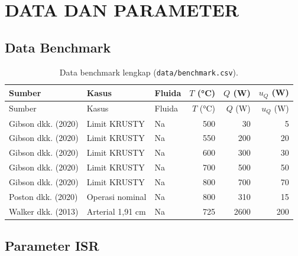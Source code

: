 \documentclass[
  indonesian,
  12pt,
  a4paper,
]{report}
\begin{document}
\chapter{DATA DAN PARAMETER}\label{data-dan-parameter}

\section{Data Benchmark}\label{data-benchmark}

\begin{longtable}[]{@{}lllrrr@{}}
\caption{Data benchmark lengkap
(\protect\texttt{data/benchmark.csv}).}\label{tbl-benchB}\tabularnewline
\toprule\noalign{}
Sumber & Kasus & Fluida & \(T\) (°C) & \(Q\) (W) & \(u_Q\) (W) \\
\midrule\noalign{}
\endfirsthead
\toprule\noalign{}
Sumber & Kasus & Fluida & \(T\) (°C) & \(Q\) (W) & \(u_Q\) (W) \\
\midrule\noalign{}
\endhead
\bottomrule\noalign{}
\endlastfoot
Gibson dkk. (2020) & Limit KRUSTY & Na & 500 & 30 & 5 \\
Gibson dkk. (2020) & Limit KRUSTY & Na & 550 & 200 & 20 \\
Gibson dkk. (2020) & Limit KRUSTY & Na & 600 & 300 & 30 \\
Gibson dkk. (2020) & Limit KRUSTY & Na & 700 & 500 & 50 \\
Gibson dkk. (2020) & Limit KRUSTY & Na & 800 & 700 & 70 \\
Poston dkk. (2020) & Operasi nominal & Na & 800 & 310 & 15 \\
Walker dkk. (2013) & Arterial 1,91 cm & Na & 725 & 2600 & 200 \\
\end{longtable}

\section{Parameter ISR}\label{parameter-isr}
\end{document}
